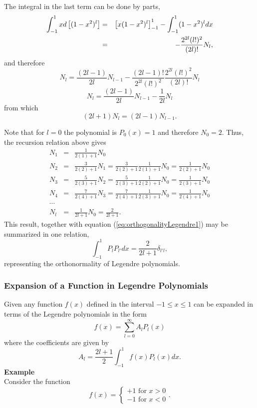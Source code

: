 The integral in the last term can be done by parts,
 \begin{eqnarray}
 \int_{-1}^{1}  xd\left[( 1 - x^2 )^{l}  \right] &=& \left[ x( 1 - x^2 )^{l} \right]_{-1}^1 - \int_{-1}^{1}  ( 1 - x^2 )^{l}  dx \notag \\
 &=& - \frac{2^{2l} (l!)^2}{(2l)!} N_l,
 \end{eqnarray}
 and therefore
\begin{equation}
N_l  = \frac{(2l-1)}{2 l} N_{l-1}  -  \frac{(2l-1)!}{2^{2l} (l!)^2} \frac{2^{2l} (l!)^2}{(2l)!} N_l 
\end{equation}
\begin{equation}
N_l  = \frac{(2l-1)}{2 l} N_{l-1}  -  \frac{1}{2l} N_l 
\end{equation}
from which
\begin{equation}
(2l+1)N_l  = (2l-1) N_{l-1} .
\end{equation}

Note that for $l=0$ the polynomial is $P_0(x) = 1$ and therefore $N_0 = 2$. Thus, the recursion relation above gives
\begin{eqnarray}
N_1 &=& \frac{1}{2(1)+1} N_0\\
N_2 &=& \frac{3}{2(2)+1} N_1=\frac{3}{2(2)+1} \frac{1}{2(1)+1} N_0 = \frac{1}{2(2)+1} N_0 \\
N_3 &=& \frac{5}{2(3)+1} N_2= \frac{5}{2(3)+1}  \frac{1}{2(2)+1} N_0 = \frac{1}{2(3)+1}  N_0\\
N_4 &=& \frac{7}{2(4)+1} N_3= \frac{7}{2(4)+1}  \frac{1}{2(3)+1}  N_0 = \frac{1}{2(4)+1}  N_0\\
\cdots & & \\
N_l &=&  \frac{1}{2l+1}  N_0 = \frac{2}{2l+1}.
\end{eqnarray}
This result, together with equation (\ref{eq:orthogonalityLegendre1}) may be summarized in one relation,
\begin{equation}
\int_{-1}^{1} P_{l}  P_{l'}  dx = \frac{2}{2l+1} \delta_{l'l}, 
\end{equation}
representing the orthonormality of Legendre polynomials.\\

\subsubsection{Expansion of a Function in Legendre Polynomials}
Given any function $f(x)$ defined in the interval $-1 \le x \le 1$ can be expanded in terms of the Legendre polynomials in the form
\begin{equation}
f(x) = \sum_{l=0}^\infty A_l P_l (x)
\end{equation} 
where the coefficients are given by
\begin{equation}
A_l = \frac{2l+1}{2} \int_{-1} ^1 f(x) P_l(x) dx.
\end{equation}
\textbf{Example}\\
Consider the function
\begin{equation}
f(x) = 
\begin{cases}
+1 \text{ for } x>0 \\
-1 \text{ for } x<0
\end{cases} .
\end{equation}

